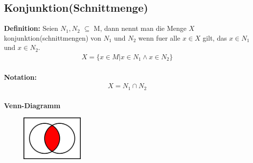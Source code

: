 \documentclass[../AbiMappe_Mathe.tex]{subfiles}
\begin{document}
\subsection{Konjunktion(Schnittmenge)}
\textbf{Definition:} Seien $N_1,N_2$ $\subseteq$ M, dann nennt man die Menge $X$ konjunktion(schnittmengen) von $N_1$ und  $N_2$ wenn fuer alle $x \in X$ gilt, das $x \in N_1$ und $x \in N_2$.
\begin{align*}
X=\{x \in M| x \in N_1 \land x \in N_2 \}
\end{align*}
\\
\textbf{Notation:}
\begin{align*}
X=N_1 \cap N_2
\end{align*}
\\
\textbf{Venn-Diagramm}
\begin{figure}[H]
\centering
\includegraphics[width=117px, height=85.5px]{VennKon.png}
\end{figure}
\end{document}
